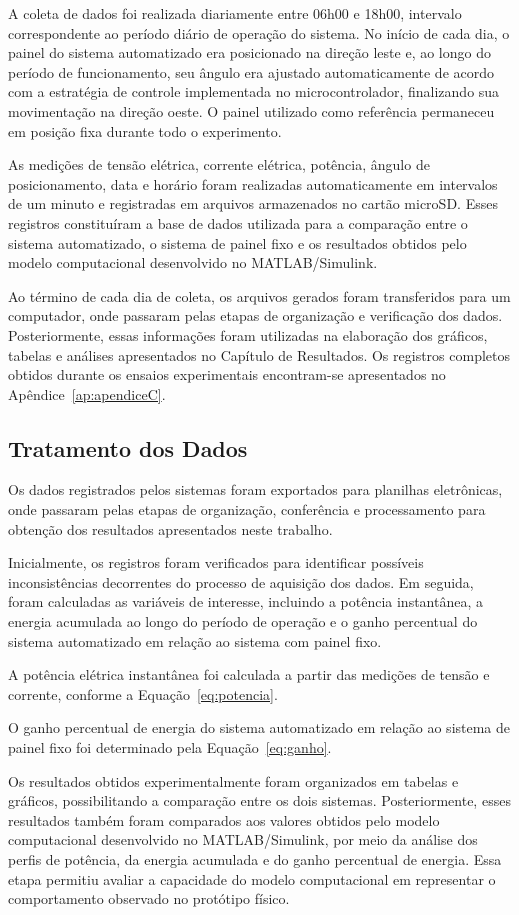 A coleta de dados foi realizada diariamente entre 06h00 e 18h00, intervalo correspondente ao período diário de operação do sistema. No início de cada dia, o painel do sistema automatizado era posicionado na direção leste e, ao longo do período de funcionamento, seu ângulo era ajustado automaticamente de acordo com a estratégia de controle implementada no microcontrolador, finalizando sua movimentação na direção oeste. O painel utilizado como referência permaneceu em posição fixa durante todo o experimento.

As medições de tensão elétrica, corrente elétrica, potência, ângulo de posicionamento, data e horário foram realizadas automaticamente em intervalos de um minuto e registradas em arquivos armazenados no cartão microSD. Esses registros constituíram a base de dados utilizada para a comparação entre o sistema automatizado, o sistema de painel fixo e os resultados obtidos pelo modelo computacional desenvolvido no MATLAB/Simulink.

Ao término de cada dia de coleta, os arquivos gerados foram transferidos para um computador, onde passaram pelas etapas de organização e verificação dos dados. Posteriormente, essas informações foram utilizadas na elaboração dos gráficos, tabelas e análises apresentados no Capítulo de Resultados. Os registros completos obtidos durante os ensaios experimentais encontram-se apresentados no Apêndice~\ref{ap:apendiceC}.

\subsection{Tratamento dos Dados}

Os dados registrados pelos sistemas foram exportados para planilhas eletrônicas, onde passaram pelas etapas de organização, conferência e processamento para obtenção dos resultados apresentados neste trabalho.

Inicialmente, os registros foram verificados para identificar possíveis inconsistências decorrentes do processo de aquisição dos dados. Em seguida, foram calculadas as variáveis de interesse, incluindo a potência instantânea, a energia acumulada ao longo do período de operação e o ganho percentual do sistema automatizado em relação ao sistema com painel fixo.

A potência elétrica instantânea foi calculada a partir das medições de tensão e corrente, conforme a Equação~\ref{eq:potencia}.

O ganho percentual de energia do sistema automatizado em relação ao sistema de painel fixo foi determinado pela Equação~\ref{eq:ganho}.

Os resultados obtidos experimentalmente foram organizados em tabelas e gráficos, possibilitando a comparação entre os dois sistemas. Posteriormente, esses resultados também foram comparados aos valores obtidos pelo modelo computacional desenvolvido no MATLAB/Simulink, por meio da análise dos perfis de potência, da energia acumulada e do ganho percentual de energia. Essa etapa permitiu avaliar a capacidade do modelo computacional em representar o comportamento observado no protótipo físico.
